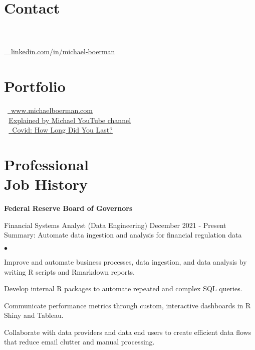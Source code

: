 \documentclass[margin, line]{res}
\newenvironment{list2}{
  \begin{list}{$\bullet$}{%
      \setlength{\itemsep}{0.04in}
      \setlength{\parsep}{0in} \setlength{\parskip}{0in}
      \setlength{\topsep}{0.05in} \setlength{\partopsep}{0in} 
      \setlength{\leftmargin}{\dimexpr 26pt-0.05in}}}
    {\end{list}}
\begin{document}

\begin{resume}

\vspace{-1mm}
\section{\sc Contact}

 \\
 \\
\faLinkedinIn  \href{https://www.linkedin.com/in/michael-boerman}{\ttfamily \, \, linkedin.com/in/michael-boerman}\\
\vspace{-.65cm}


\section{\sc Portfolio}
\faBriefcase \, \href{https://www.michaelboerman.com/}{\ttfamily  \, www.michaelboerman.com}\\
 \,\, \href{https://www.youtube.com/channel/UCxFMrMb6PrS7SOrQi-BfMUw/videos?view=0&sort=p&flow=grid}{ Explained by Michael YouTube channel}\\
\faChartLine \,\, \href{https://michaelboerman.shinyapps.io/covid_percentiles/}{\, Covid: How Long Did You Last?}\\
\vspace{-.35cm}


\section{\sc Professional \\ Job History }
{\bf Federal Reserve Board of Governors}\\

\vspace{-.65cm}

Financial Systems Analyst (Data Engineering) \hfill December 2021 - Present\\
\hspace*{3mm} 
    Summary: Automate data ingestion and analysis for financial regulation data
\hspace*{3mm}
    \begin{list2}
        \item Improve and automate business processes, data ingestion, and data analysis by writing R scripts and Rmarkdown reports.
        \item Develop internal R packages to automate repeated and complex SQL queries.
        \item Communicate performance metrics through custom, interactive dashboards in R Shiny and Tableau.
        \item Collaborate with data providers and data end users to create efficient data flows that reduce email clutter and manual processing.
    \end{list2}



\end{resume}
\end{document}
